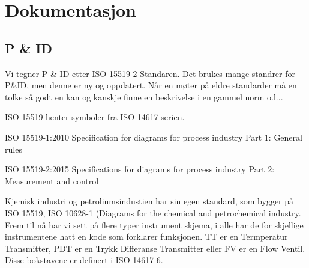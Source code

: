 \section{Dokumentasjon}
\subsection{P \& ID} 

Vi tegner P \& ID etter ISO 15519-2 Standaren. Det brukes mange standrer
for P\&ID, men denne er ny og oppdatert. Når en møter på eldre standarder
må en tolke så godt en kan og kanskje finne en beskrivelse i en gammel
norm o.l...

ISO 15519 henter symboler fra ISO 14617 serien. 

ISO 15519-1:2010 Specification for diagrams for process industry \textemdash{}
Part 1: General rules

ISO 15519-2:2015 Specifications for diagrams for process industry
\textemdash{} Part 2: Measurement and control

Kjemisk industri og petroliumsindustien har sin egen standard, som
bygger på ISO 15519, ISO 10628-1 (Diagrams for the chemical and petrochemical
industry. 
Frem til nå har vi sett på flere typer instrument skjema, i alle har de for skjellige instrumentene hatt en kode som forklarer funksjonen. TT er en Termperatur Transmitter, PDT er en Trykk Differanse Transmitter eller FV er en Flow Ventil. Disse bokstavene er definert i ISO 14617-6. 

\vskip 5pt 

\vskip 5pt 

\vskip 5pt 


\vskip 5pt 

